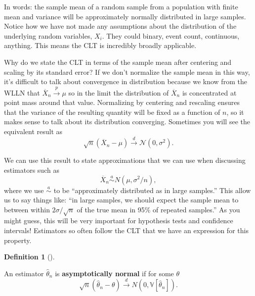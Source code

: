 \documentclass[
  letterpaper,
  DIV=11,
  numbers=noendperiod]{scrreprt}
\newcommand{\V}{\mathbb{V}}
\newcommand{\N}{\mathcal{N}}
\newcommand{\Xbar}{\overline{X}}
\newcommand{\inprob}{\overset{p}{\to}}
\newcommand{\indist}{\overset{d}{\to}}
\theoremstyle{definition}
\newtheorem{definition}{Definition}[chapter]
\theoremstyle{plain}
\theoremstyle{definition}
\theoremstyle{remark}
\begin{document}
In words: the sample mean of a random sample from a population with
finite mean and variance will be approximately normally distributed in
large samples. Notice how we have not made any assumptions about the
distribution of the underlying random variables, \(X_i\). They could
binary, event count, continuous, anything. This means the CLT is
incredibly broadly applicable.

\begin{tcolorbox}[enhanced jigsaw, title=\textcolor{quarto-callout-note-color}{\faInfo}\hspace{0.5em}{Notation alert}, breakable, titlerule=0mm, opacityback=0, rightrule=.15mm, bottomrule=.15mm, colframe=quarto-callout-note-color-frame, coltitle=black, colbacktitle=quarto-callout-note-color!10!white, bottomtitle=1mm, toptitle=1mm, colback=white, arc=.35mm, opacitybacktitle=0.6, toprule=.15mm, leftrule=.75mm, left=2mm]

Why do we state the CLT in terms of the sample mean after centering and
scaling by its standard error? If we don't normalize the sample mean in
this way, it's difficult to talk about convergence in distribution
because we know from the WLLN that \(\Xbar_n \inprob \mu\) so in the
limit the distribution of \(\Xbar_n\) is concentrated at point mass
around that value. Normalizing by centering and rescaling ensures that
the variance of the resulting quantity will be fixed as a function of
\(n\), so it makes sense to talk about its distribution converging.
Sometimes you will see the equivalent result as \[
\sqrt{n}\left(\Xbar_n - \mu\right) \indist \N(0, \sigma^2).
\]

\end{tcolorbox}

We can use this result to state approximations that we can use when
discussing estimators such as \[
\Xbar_n \overset{a}{\sim} N(\mu, \sigma^2/n),
\] where we use \(\overset{a}{\sim}\) to be ``approximately distributed
as in large samples.'' This allow us to say things like: ``in large
samples, we should expect the sample mean to between within
\(2\sigma/\sqrt{n}\) of the true mean in 95\% of repeated samples.'' As
you might guess, this will be very important for hypothesis tests and
confidence intervals! Estimators so often follow the CLT that we have an
expression for this property.

\leavevmode{}%
\begin{definition}[]\label{def-asymptotically-normal}

An estimator \(\widehat{\theta}_n\) is \textbf{asymptotically normal} if
for some \(\theta\) \[
\sqrt{n}\left( \widehat{\theta}_n - \theta \right) \indist N\left(0,\V[\widehat{\theta}_n]\right).
\]

\end{definition}
\end{document}
